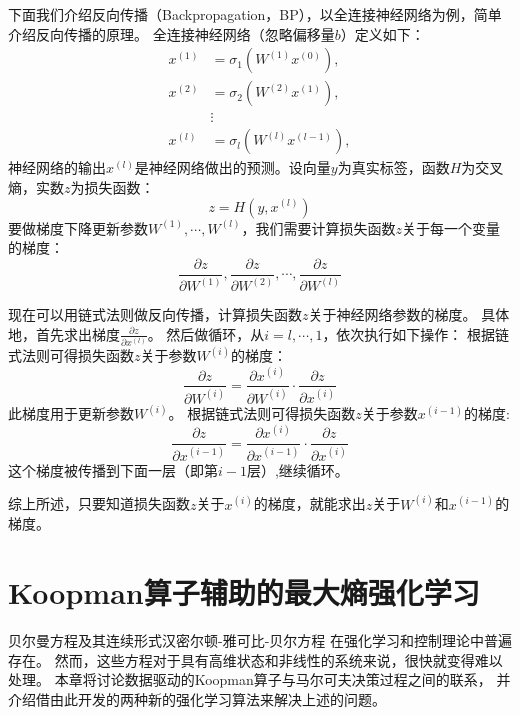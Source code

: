 \documentclass[AutoFakeBold]{LZUThesis}
\begin{document}
下面我们介绍反向传播（Backpropagation，BP），以全连接神经网络为例，简单介绍反向传播的原理。
全连接神经网络（忽略偏移量$b$）定义如下：
\begin{align*}
  x^{(1)} &= \sigma_1 (W^{(1)} x^{(0)}), \\
  x^{(2)} &= \sigma_2 (W^{(2)} x^{(1)}), \\
  &\vdots                                \\
  x^{(l)} &= \sigma_l (W^{(l)} x^{(l - 1)}),
\end{align*}
神经网络的输出$x^{(l)}$是神经网络做出的预测。设向量$y$为真实标签，函数$H$为交叉熵，实数$z$为损失函数：
\begin{equation}
  z = H(y, x^{(l)})
\end{equation}
要做梯度下降更新参数$W^{(1)}, \cdots, W^{(l)}$，我们需要计算损失函数$z$关于每一个变量的梯度：
\begin{equation}
  \frac{\partial z}{\partial W^{(1)}}, \frac{\partial z}{\partial W^{(2)}}, 
  \cdots, \frac{\partial z}{\partial W^{(l)}}
\end{equation}

现在可以用链式法则做反向传播，计算损失函数$z$关于神经网络参数的梯度。
具体地，首先求出梯度$\frac{\partial z}{\partial x^{(l)}}$。
然后做循环，从$i = l, \cdots, 1$，依次执行如下操作：
根据链式法则可得损失函数$z$关于参数$W^{(i)}$的梯度：
\begin{equation}
  \frac{\partial z}{\partial W^{(i)}} = \frac{\partial x^{(i)}}{\partial W^{(i)}} 
  \cdot \frac{\partial z}{\partial x^{(i)}}
\end{equation}
此梯度用于更新参数$W^{(i)}$。
根据链式法则可得损失函数$z$关于参数$x^{(i - 1)}$的梯度:
\begin{equation}
  \frac{\partial z}{\partial x^{(i - 1)}} = \frac{\partial x^{(i)}}{\partial x^{(i - 1)}} 
  \cdot \frac{\partial z}{\partial x^{(i)}}
\end{equation}
这个梯度被传播到下面一层（即第$i - 1$层）,继续循环。

综上所述，只要知道损失函数$z$关于$x^{(i)}$的梯度，就能求出$z$关于$W^{(i)}$和$x^{(i - 1)}$的梯度。

\chapter{Koopman算子辅助的最大熵强化学习}

贝尔曼方程及其连续形式汉密尔顿-雅可比-贝尔方程
在强化学习和控制理论中普遍存在。
然而，这些方程对于具有高维状态和非线性的系统来说，很快就变得难以处理。
本章将讨论数据驱动的Koopman算子与马尔可夫决策过程之间的联系，
并介绍借由此开发的两种新的强化学习算法来解决上述的问题。
\end{document}
